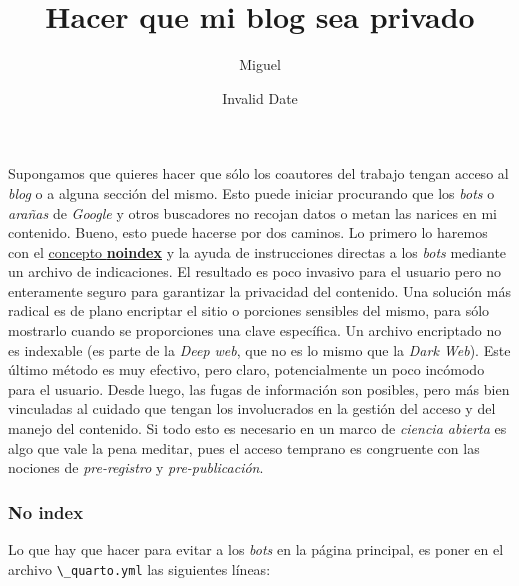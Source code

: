 \documentclass[
  letterpaper,
  DIV=11,
  numbers=noendperiod]{scrartcl}
\title{Hacer que mi blog sea privado}
\author{Miguel}
\date{Invalid Date}
\begin{document}
\maketitle


Supongamos que quieres hacer que sólo los coautores del trabajo tengan
acceso al \emph{blog} o a alguna sección del mismo. Esto puede iniciar
procurando que los \emph{bots} o \emph{arañas} de \emph{Google} y otros
buscadores no recojan datos o metan las narices en mi contenido. Bueno,
esto puede hacerse por dos caminos. Lo primero lo haremos con el
\href{https://seranking.com/es/blog/noindex/}{concepto \textbf{noindex}}
y la ayuda de instrucciones directas a los \emph{bots} mediante un
archivo de indicaciones. El resultado es poco invasivo para el usuario
pero no enteramente seguro para garantizar la privacidad del contenido.
Una solución más radical es de plano encriptar el sitio o porciones
sensibles del mismo, para sólo mostrarlo cuando se proporciones una
clave específica. Un archivo encriptado no es indexable (es parte de la
\emph{Deep web}, que no es lo mismo que la \emph{Dark Web}). Este último
método es muy efectivo, pero claro, potencialmente un poco incómodo para
el usuario. Desde luego, las fugas de información son posibles, pero más
bien vinculadas al cuidado que tengan los involucrados en la gestión del
acceso y del manejo del contenido. Si todo esto es necesario en un marco
de \emph{ciencia abierta} es algo que vale la pena meditar, pues el
acceso temprano es congruente con las nociones de \emph{pre-registro} y
\emph{pre-publicación}.

\subsubsection{No index}\label{no-index}

Lo que hay que hacer para evitar a los \emph{bots} en la página
principal, es poner en el archivo \texttt{\textbackslash{}\_quarto.yml}
las siguientes líneas:
\end{document}
